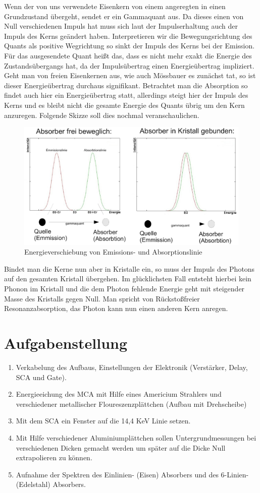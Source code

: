 \documentclass[12pt]{article}
\begin{document}
Wenn der von uns verwendete Eisenkern von einem angeregten in einen Grundzustand übergeht, sendet er ein Gammaquant aus. Da dieses einen von Null verschiedenen 
Impuls hat muss sich laut der Impulserhaltung auch der Impuls des Kerns geändert haben. Interpretieren wir die Bewegungsrichtung des Quants als positive
Wegrichtung so sinkt der Impuls des Kerns bei der Emission. Für das ausgesendete Quant heißt das, dass es nicht mehr exakt die Energie des Zustandsübergangs
hat, da der Impulsübertrag einen Energieübertrag impliziert. Geht man von freien Eisenkernen aus, wie auch Mössbauer es zunächst tat, so ist dieser Energieübertrag
durchaus signifikant. Betrachtet man die Absorption so findet auch hier ein Energieübertrag statt, allerdings steigt hier der Impuls des Kerns und es bleibt
nicht die gesamte Energie des Quants übrig um den Kern anzuregen. Folgende Skizze soll dies nochmal veranschaulichen.
\begin{figure}
 \includegraphics[width=0.9\linewidth]{pictures/linienskizze.ps}
 \caption{Energieverschiebung von Emissions- und Absorptionslinie}
 \label{linienskizze}
\end{figure}


Bindet man die Kerne nun aber in Kristalle ein, so muss der Impuls des Photons auf den gesamten Kristall übergehen. Im glücklichsten Fall entsteht
hierbei kein Phonon im Kristall und die dem Photon fehlende Energie geht mit steigender Masse des Kristalls gegen Null. Man spricht von Rückstoßfreier
Resonanzabsorption, das Photon kann nun einen anderen Kern anregen.
\section{Aufgabenstellung}
\begin{enumerate}
 \item Verkabelung des Aufbaus, Einstellungen der Elektronik (Verstärker, Delay, SCA und Gate).
 \item Energieeichung des MCA mit Hilfe eines Americium Strahlers und verschiedener metallischer Floureszenzplättchen (Aufbau mit Drehscheibe)
 \item Mit dem SCA ein Fenster auf die 14,4 KeV Linie setzen.
 \item Mit Hilfe verschiedener Aluminiumplättchen sollen Untergrundmessungen bei verschiedenen Dicken gemacht werden um später auf die Dicke Null extrapolieren zu können.
 \item Aufnahme der Spektren des Einlinien- (Eisen) Absorbers und des 6-Linien- (Edelstahl) Absorbers.
\end{enumerate}
\end{document}
